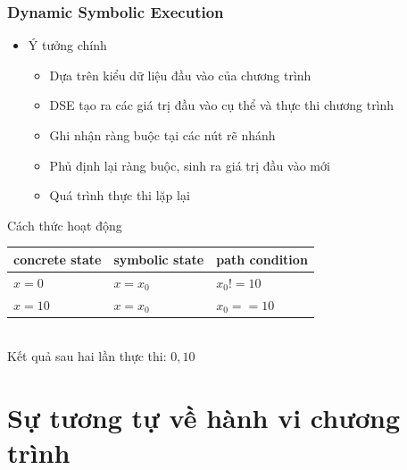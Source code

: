 \documentclass{beamer}
\begin{document}
\begin{frame}
  \frametitle{Dynamic Symbolic Execution}
  \begin{itemize}
  \item Ý tưởng chính
    \begin{itemize}
    \item Dựa trên kiểu dữ liệu đầu vào của chương trình
    \item DSE tạo ra các giá trị đầu vào cụ thể và thực thi chương trình 
    \item Ghi nhận ràng buộc tại các nút rẽ nhánh
    \item Phủ định lại ràng buộc, sinh ra giá trị đầu vào mới
    \item Quá trình thực thi lặp lại
    \end{itemize}
  \end{itemize} \pause
	
  \begin{block}{Cách thức hoạt động}
    \begin{minipage}[T]{0.40\linewidth}
      
    \end{minipage}
    \hfill    
    \begin{minipage}[T]{0.55\linewidth}
		{\footnotesize\centering
		\begin{tabular}{  m{4em} | m{4em} | m{4em}  }
		concrete state & symbolic state & path condition \\ 
		\hline
		$ x = 0 $ & $ x = x_{0} $ & $ x_{0} != 10 $ \\  
		\hline
		$ x = 10 $ & $ x = x_{0} $ & $ x_{0} == 10 $ \\ 		
		\end{tabular}
		\\ \pause
		Kết quả sau hai lần thực thi: $ 0, 10 $ 
		}
    \end{minipage}
  \end{block}
	
\end{frame}

\section{Sự tương tự về hành vi chương trình}
\end{document}
